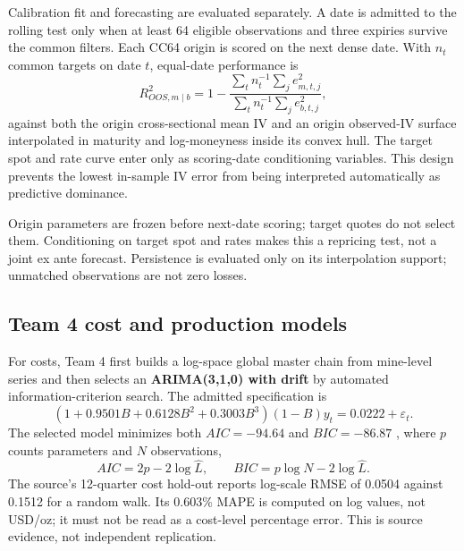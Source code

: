 Calibration fit and forecasting are evaluated separately. A date is admitted to the rolling test only when at least 64 eligible observations and three expiries survive the common filters. Each CC64 origin is scored on the next dense date. With $n_t$ common targets on date $t$, equal-date performance is
\begin{equation}
R^2_{OOS,m\mid b}=1-\frac{\sum_t n_t^{-1}\sum_j e_{m,t,j}^2}{\sum_t n_t^{-1}\sum_j e_{b,t,j}^2},
\label{eq:oos_r2}
\end{equation}
against both the origin cross-sectional mean IV and an origin observed-IV surface interpolated in maturity and log-moneyness inside its convex hull. The target spot and rate curve enter only as scoring-date conditioning variables. This design prevents the lowest in-sample IV error from being interpreted automatically as predictive dominance.

Origin parameters are frozen before next-date scoring; target quotes do not select them. Conditioning on target spot and rates makes this a repricing test, not a joint ex ante forecast. Persistence is evaluated only on its interpolation support; unmatched observations are not zero losses.



\subsection{Team 4 cost and production models}
\label{sec:paper-operating-models}
For costs, Team 4 first builds a log-space global master chain from mine-level series and then selects an \textbf{ARIMA(3,1,0) with drift} by automated information-criterion search. The admitted specification is
\begin{equation}
(1+0.9501B+0.6128B^2+0.3003B^3)(1-B)y_t
=0.0222+\varepsilon_t.
\label{eq:cost_arima}
\end{equation}
The selected model minimizes both $AIC=-94.64$ and $BIC=-86.87$ \citep{akaike1974,schwarz1978}, where $p$ counts parameters and $N$ observations,
\begin{equation}
AIC=2p-2\log\widehat L,\qquad BIC=p\log N-2\log\widehat L.
\label{eq:aicbic}
\end{equation}
The source's 12-quarter cost hold-out reports log-scale RMSE of 0.0504 against 0.1512 for a random walk. Its 0.603\% MAPE is computed on log values, not USD/oz; it must not be read as a cost-level percentage error. This is source evidence, not independent replication.

